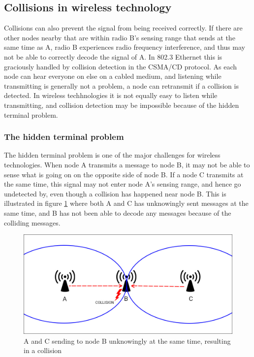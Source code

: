 \documentclass[a4paper,UKenglish]{report}
\begin{document}
\subsection{Collisions in wireless technology}
Collisions can also prevent the signal from being received correctly.
If there are other nodes nearby that are within radio B's sensing range that sends at the same time as A, 
radio B experiences radio frequency interference, and thus may not be able to correctly decode the signal of A. In 802.3 Ethernet this
is graciously handled by collision detection in the CSMA/CD protocol. As each node can hear everyone on else on a cabled medium,
and listening while transmitting is generally not a problem, a node can retransmit if a collision is detected. In wireless techhnologies
it is not equally easy to listen while transmitting, and collision detection may be impossible because of the hidden terminal problem.

\subsubsection{The hidden terminal problem}
The hidden terminal problem is one of the major challenges for wireless technologies. 
When node A transmits a message to node B, it may not be able to sense what is going on
on the opposite side of node B. If a node C transmits at the same time, this signal may not enter node A's sensing range, and
hence go undetected by, even though a collision has happened near node B. This is illustrated in figure \ref{fig:hiddenterminal} where
both A and C has unknowingly sent messages at the same time, and B has not been able to decode any messages because of the colliding messages. 

\begin{figure}
	\center
	\includegraphics[scale=0.3]{Images/Hiddenterminalfigure.jpg}
	\caption{A and C sending to node B unknowingly at the same time, resulting in a collision}
	\label{fig:hiddenterminal}
\end{figure}
\end{document}
